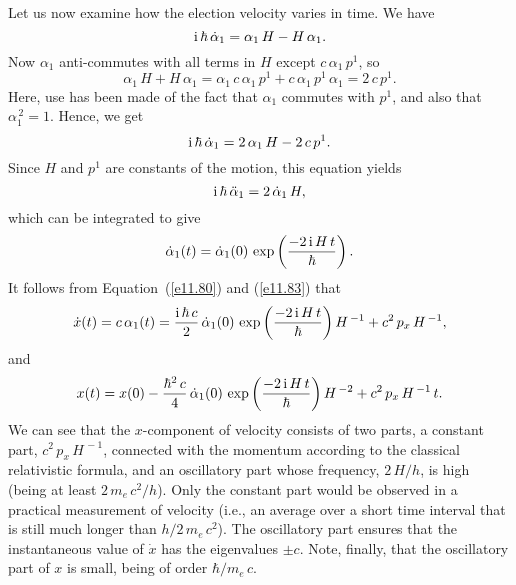 Let us now examine how the election velocity varies in time. We have
\begin{equation}
{\rm i}\,\hbar\,\dot{\alpha}_1  =\alpha_1\,H-H\,\alpha_1.
\end{equation}
Now $\alpha_1$ anti-commutes with all terms in $H$ except $c\,\alpha_1\,p^1$,
so
\begin{equation}
\alpha_1\,H+H\,\alpha_1  = \alpha_1\,c\,\alpha_1\,p^1 + c\,\alpha_1\,p^1\,\alpha_1 = 2\,c\,p^1.
\end{equation}
Here, use has been made of the fact that $\alpha_1$ commutes with $p^1$, and also that $\alpha_1^{\,2}=1$. 
Hence, we get
\begin{equation}\label{e11.83}
{\rm i}\,\hbar\,\dot{\alpha}_1 = 2\,\alpha_1\,H-2\,c\,p^1.
\end{equation}
Since $H$ and $p^1$ are constants of the motion, this equation yields
\begin{equation}
{\rm i}\,\hbar\,\ddot{\alpha}_1 = 2\,\dot{\alpha}_1\,H,
\end{equation}
which can be integrated to give
\begin{equation}
\dot{\alpha}_1(t) = \dot{\alpha}_1(0)\,\exp\left(\frac{-2\,{\rm i}\,H\,t}{\hbar}\right).
\end{equation}
It follows from Equation~(\ref{e11.80}) and (\ref{e11.83}) that
\begin{equation}
\dot{x}(t) = c\,\alpha_1(t) = \frac{{\rm i}\,\hbar\,c}{2}\,\dot{\alpha}_1(0)\,\exp\left(\frac{-2\,{\rm i}\,H\,t}{\hbar}\right)H^{\,-1} + c^2\,p_x\,H^{\,-1},
\end{equation}
and
\begin{equation}
x(t) = x(0)- \frac{\hbar^2\,c}{4}\,\dot{\alpha}_1(0)\,\exp\left(\frac{-2\,{\rm i}\,H\,t}{\hbar}\right)H^{\,-2} + c^2\,p_x\,H^{\,-1}\,t.
\end{equation}
We can see that the $x$-component of velocity consists of two parts, a constant part, $c^2\,p_x\,H^{\,-1}$, connected with the momentum
according to the classical relativistic formula, and an oscillatory part whose frequency, $2\,H/h$,  is high (being at least $2\,m_e\,c^2/h$). 
Only the constant part would be observed in a practical measurement of velocity (i.e., an average over a short time interval that is still much longer than $h/2\,m_e\,c^2$). 
The oscillatory part ensures that the instantaneous value of $\dot{x}$ has the eigenvalues $\pm c$.  Note, finally, that the oscillatory part of $x$ is small, being of
order
$\hbar/m_e\,c$.

